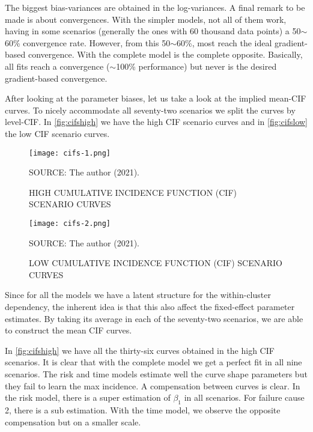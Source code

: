 The biggest bias-variances are obtained in the log-variances. A final
remark to be made is about convergences. With the simpler models, not
all of them work, having in some scenarios (generally the ones with 60
thousand data points) a 50\(\sim\)60\% convergence rate. However, from
this 50\(\sim\)60\%, most reach the ideal gradient-based
convergence. With the complete model is the complete
opposite. Basically, all fits reach a convergence (\(\sim\)100\%
performance) but never is the desired gradient-based convergence.

After looking at the parameter biases, let us take a look at the implied
mean-CIF curves. To nicely accommodate all seventy-two scenarios we
split the curves by level-CIF. In \autoref{fig:cifshigh} we have the
high CIF scenario curves and in \autoref{fig:cifslow} the low CIF
scenario curves.

\begin{figure}[H]
 \setlength{\abovecaptionskip}{.0001pt}
 \caption{HIGH CUMULATIVE INCIDENCE FUNCTION (CIF) SCENARIO CURVES}
 \vspace{0.2cm}\centering
 \texttt{[image: cifs-1.png]}\\
 \begin{footnotesize}
  SOURCE: The author (2021).
 \end{footnotesize}
 \label{fig:cifshigh}
\end{figure}

\begin{figure}[H]
 \setlength{\abovecaptionskip}{.0001pt}
 \caption{LOW CUMULATIVE INCIDENCE FUNCTION (CIF) SCENARIO CURVES}
 \vspace{0.2cm}\centering
 \texttt{[image: cifs-2.png]}\\
 \begin{footnotesize}
  SOURCE: The author (2021).
 \end{footnotesize}
 \label{fig:cifslow}
\end{figure}

Since for all the models we have a latent structure for the
within-cluster dependency, the inherent idea is that this also affect
the fixed-effect parameter estimates. By taking its average in each of
the seventy-two scenarios, we are able to construct the mean CIF curves.

In \autoref{fig:cifshigh} we have all the thirty-six curves obtained in
the high CIF scenarios. It is clear that with the complete model we get
a perfect fit in all nine scenarios. The risk and time models estimate
well the curve shape parameters but they fail to learn the max
incidence. A compensation between curves is clear. In the risk model,
there is a super estimation of \(\beta_{1}\) in all scenarios. For
failure cause 2, there is a sub estimation. With the time model, we
observe the opposite compensation but on a smaller scale.


